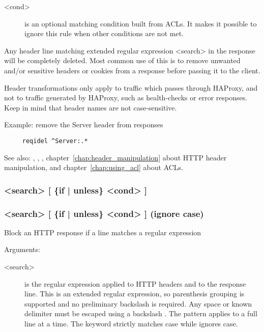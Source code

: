 {\begin{description}
  \item[<cond>] is an optional matching condition built from ACLs. It makes it
              possible to ignore this rule when other conditions are not met.
  \end{description}

  Any header line matching extended regular expression <search> in the response
  will be completely deleted. Most common use of this is to remove unwanted
  and/or sensitive headers or cookies from a response before passing it to the
  client.

  Header transformations only apply to traffic which passes through HAProxy,
  and not to traffic generated by HAProxy, such as health-checks or error
  responses. Keep in mind that header names are not case-sensitive.

  Example: remove the Server header from responses
  \begin{verbatim}
     reqidel ^Server:.*
  \end{verbatim}

  See also: , , , chapter~\ref{chap:header_manipulation} about HTTP header
            manipulation, and chapter~\ref{chap:using_acl} about ACLs.

\subsubsection[rspdeny] { <search> [ \{if | unless\} <cond> ]}
\subsubsection[rspideny] { <search> [ \{if | unless\} <cond> ] (ignore case)}

  Block an HTTP response if a line matches a regular expression


  Arguments:
  \begin{description}
  \item[<search>] is the regular expression applied to HTTP headers and to the
              response line. This is an extended regular expression, so
              parenthesis grouping is supported and no preliminary backslash
              is required. Any space or known delimiter must be escaped using
              a backslash \chr{\bslash}. The pattern applies to a full line at a time.
              The  keyword strictly matches case while 
              ignores case.


\end{description}}
